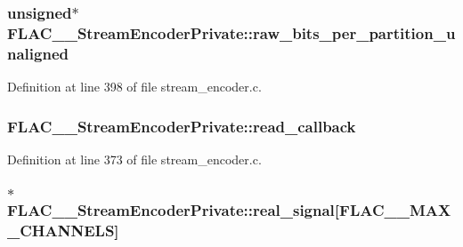 \subsubsection[{\texorpdfstring{raw\+\_\+bits\+\_\+per\+\_\+partition\+\_\+unaligned}{raw_bits_per_partition_unaligned}}]{\setlength{\rightskip}{0pt plus 5cm}unsigned$\ast$ F\+L\+A\+C\+\_\+\+\_\+\+Stream\+Encoder\+Private\+::raw\+\_\+bits\+\_\+per\+\_\+partition\+\_\+unaligned}\hypertarget{struct_f_l_a_c_____stream_encoder_private_a39d6113c9c4f939de6238ae6af988950}{}\label{struct_f_l_a_c_____stream_encoder_private_a39d6113c9c4f939de6238ae6af988950}


Definition at line 398 of file stream\+\_\+encoder.\+c.

\subsubsection[{\texorpdfstring{read\+\_\+callback}{read_callback}}]{ F\+L\+A\+C\+\_\+\+\_\+\+Stream\+Encoder\+Private\+::read\+\_\+callback}\hypertarget{struct_f_l_a_c_____stream_encoder_private_a6009c55a758c32218403c5ade2037424}{}\label{struct_f_l_a_c_____stream_encoder_private_a6009c55a758c32218403c5ade2037424}


Definition at line 373 of file stream\+\_\+encoder.\+c.

\subsubsection[{\texorpdfstring{real\+\_\+signal}{real_signal}}]{$\ast$ F\+L\+A\+C\+\_\+\+\_\+\+Stream\+Encoder\+Private\+::real\+\_\+signal\mbox{[}{\bf F\+L\+A\+C\+\_\+\+\_\+\+M\+A\+X\+\_\+\+C\+H\+A\+N\+N\+E\+LS}\mbox{]}}\hypertarget{struct_f_l_a_c_____stream_encoder_private_a1b893a8b991fc542b3740906af5a63a3}{}\label{struct_f_l_a_c_____stream_encoder_private_a1b893a8b991fc542b3740906af5a63a3}


